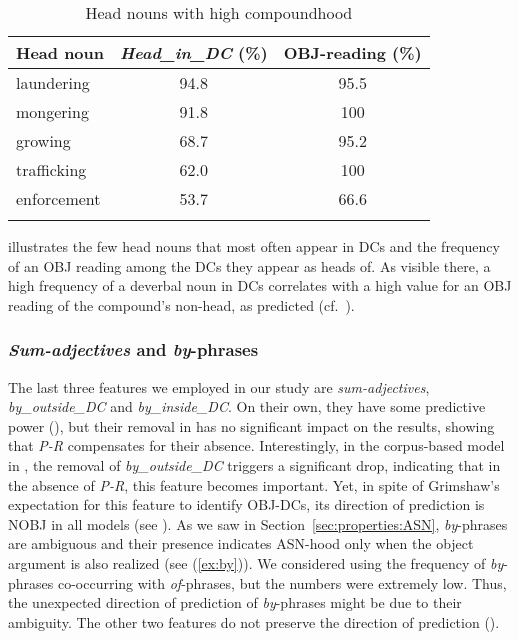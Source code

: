 \documentclass[output=paper]{langsci/langscibook}
\begin{document}
\begin{table}
\caption{\label{tab:compoundhood:ex}Head nouns with high compoundhood}
\begin{tabular}{lSS}
\lsptoprule
Head noun& {\textit{Head\_in\_DC} (\%)}& {OBJ-reading (\%)}\\
\midrule
laundering&94.8&95.5\\
mongering&91.8&100\\
growing&68.7 &95.2\\
trafficking&62.0&100\\
enforcement&53.7&66.6\\
\lspbottomrule
\end{tabular}
\end{table}

 illustrates the few head nouns that most often appear in DCs and the frequency of an OBJ reading among the DCs they appear as heads of. As visible there, a high frequency of a deverbal noun in DCs correlates with a high value for an OBJ reading of the compound's non-head, as predicted (cf.~). 

\subsubsection{\textit{Sum-adjectives} and \textit{by}-phrases}\label{sec:gia:discussion-int-by}
The last three features we employed in our study are \textit{sum-adjectives},  \textit{by\_outside\_DC} and  \textit{by\_inside\_DC}. On their own, they have some predictive power (),  {but their removal in  has no significant impact on the results, showing that \textit{P-R} compensates for their absence. Interestingly, in the corpus-based model in  , the removal of \textit{by\_outside\_DC} triggers a significant drop, indicating that in the absence of \textit{P-R}, this feature becomes important. Yet, in spite of Grimshaw's expectation for this feature to identify OBJ-DCs, its direction of prediction is NOBJ in all models (see ). As we saw in Section~\ref{sec:properties:ASN}, \textit{by}-phrases are ambiguous and their presence indicates ASN-hood only when the object argument is also realized (see (\ref{ex:by})). We considered using the frequency of  \textit{by}-phrases co-occurring with \textit{of}-phrases, but the numbers were extremely low. Thus, the unexpected direction of prediction of \textit{by}-phrases might be due to their ambiguity. The other two features do not preserve the direction of prediction ().}
\end{document}
